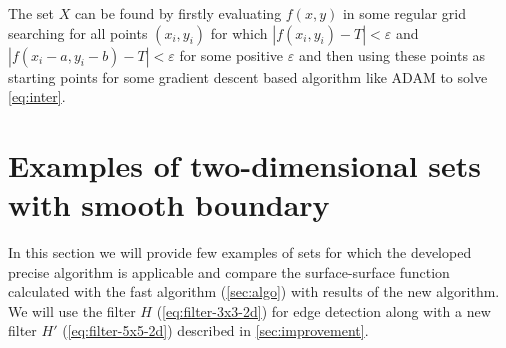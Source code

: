 \documentclass[reprint,amsmath,amssymb,aps,pre,showkeys,showpacs]{revtex4-1}
\begin{document}
The set $X$ can be found by firstly evaluating $f(x, y)$ in some regular grid
searching for all points $(x_i, y_i)$ for which $|f(x_i, y_i) - T| < \varepsilon$ 
and $|f(x_i - a, y_i - b) - T| < \varepsilon$ for some positive $\varepsilon$
and then using these points as starting points for some gradient descent based
algorithm like ADAM to solve \cref{eq:inter}.

\section{Examples of two-dimensional sets with smooth boundary}
\label{seq:examples}
In this section we will provide few examples of sets for which the developed
precise algorithm is applicable and compare the surface-surface function
calculated with the fast algorithm (\cref{sec:algo}) with results of the new
algorithm. We will use the filter $H$ (\ref{eq:filter-3x3-2d}) for edge
detection along with a new filter $H'$ (\ref{eq:filter-5x5-2d}) described in
\cref{sec:improvement}.
\end{document}
